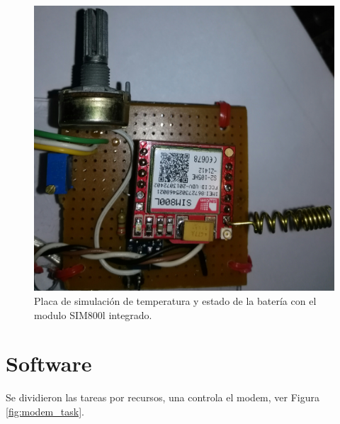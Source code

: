 \begin{figure}[h]
  \centering
  \includegraphics[scale=.03]{./Figures/placa_basica.jpg}
  \caption{Placa de simulación de temperatura y estado de la batería con el modulo SIM800l integrado.}
  \label{fig:placa_básica}
\end{figure}


\section{Software}

Se dividieron las tareas por recursos, una controla el modem, ver Figura \ref{fig:modem_task}.

